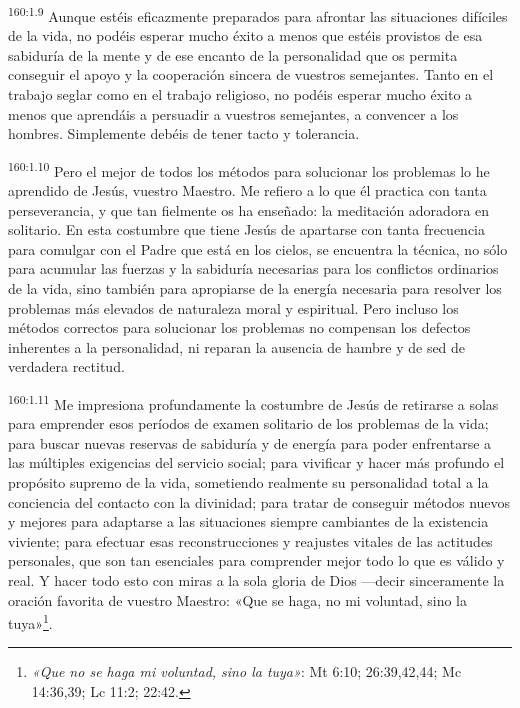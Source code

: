 \par 
\textsuperscript{160:1.9} Aunque estéis eficazmente preparados para afrontar las situaciones difíciles de la vida, no podéis esperar mucho éxito a menos que estéis provistos de esa sabiduría de la mente y de ese encanto de la personalidad que os permita conseguir el apoyo y la cooperación sincera de vuestros semejantes. Tanto en el trabajo seglar como en el trabajo religioso, no podéis esperar mucho éxito a menos que aprendáis a persuadir a vuestros semejantes, a convencer a los hombres. Simplemente debéis de tener tacto y tolerancia.

\par 
\textsuperscript{160:1.10} Pero el mejor de todos los métodos para solucionar los problemas lo he aprendido de Jesús, vuestro Maestro. Me refiero a lo que él practica con tanta perseverancia, y que tan fielmente os ha enseñado: la meditación adoradora en solitario. En esta costumbre que tiene Jesús de apartarse con tanta frecuencia para comulgar con el Padre que está en los cielos, se encuentra la técnica, no sólo para acumular las fuerzas y la sabiduría necesarias para los conflictos ordinarios de la vida, sino también para apropiarse de la energía necesaria para resolver los problemas más elevados de naturaleza moral y espiritual. Pero incluso los métodos correctos para solucionar los problemas no compensan los defectos inherentes a la personalidad, ni reparan la ausencia de hambre y de sed de verdadera rectitud.

\par 
\textsuperscript{160:1.11} Me impresiona profundamente la costumbre de Jesús de retirarse a solas para emprender esos períodos de examen solitario de los problemas de la vida; para buscar nuevas reservas de sabiduría y de energía para poder enfrentarse a las múltiples exigencias del servicio social; para vivificar y hacer más profundo el propósito supremo de la vida, sometiendo realmente su personalidad total a la conciencia del contacto con la divinidad; para tratar de conseguir métodos nuevos y mejores para adaptarse a las situaciones siempre cambiantes de la existencia viviente; para efectuar esas reconstrucciones y reajustes vitales de las actitudes personales, que son tan esenciales para comprender mejor todo lo que es válido y real. Y hacer todo esto con miras a la sola gloria de Dios ---decir sinceramente la oración favorita de vuestro Maestro: «Que se haga, no mi voluntad, sino la tuya»\footnote{\textit{«Que no se haga mi voluntad, sino la tuya»}: Mt 6:10; 26:39,42,44; Mc 14:36,39; Lc 11:2; 22:42.}.

